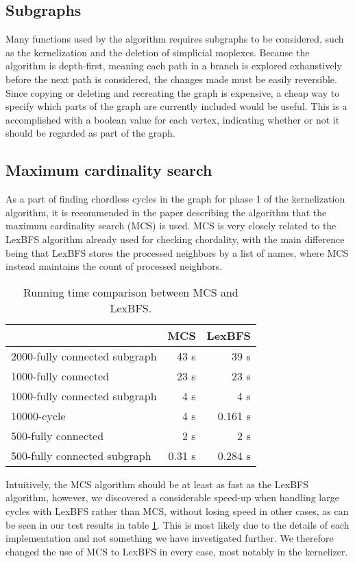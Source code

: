 \documentclass{article}
\begin{document}
		\subsection{Subgraphs}
		Many functions used by the algorithm requires subgraphs to be considered, such as the kernelization and the deletion of simplicial moplexes.
		Because the algorithm is depth-first, meaning each path in a branch is explored exhaustively before the next path is considered, the changes made must be easily reversible.
		Since copying or deleting and recreating the graph is expensive, a cheap way to specify which parts of the graph are currently included would be useful.
		This is a accomplished with a boolean value for each vertex, indicating whether or not it should be regarded as part of the graph.

		\subsection{Maximum cardinality search}
		\label{subsec:maximum-cardinality-search}
		As a part of finding chordless cycles in the graph for phase 1 of the kernelization algorithm, it is recommended in the paper describing the algorithm\cite{kernel} that the maximum cardinality search (MCS) is used.
		MCS is very closely related to the LexBFS algorithm already used for checking chordality, with the main difference being that LexBFS stores the processed neighbors by a list of names, where MCS instead maintains the count of processed neighbors.

		\begin{table}[!ht]
			\centering
			\begin{tabular}{| l | r | r |}
			\hline
											& MCS 		& LexBFS 	\\ \hline
			2000-fully connected subgraph	& 43 s  	& 39 s 		\\ \hline
			1000-fully connected 			& 23 s 		& 23 s 		\\ \hline
			1000-fully connected subgraph	& 4 s   	& 4 s 		\\ \hline
			10000-cycle 					& 4 s   	& 0.161 s 	\\ \hline 
			500-fully connected 			& 2 s   	& 2 s 		\\ \hline 
			500-fully connected subgraph 	& 0.31 s 	& 0.284 s 	\\ \hline 
			\end{tabular}
			\caption{Running time comparison between MCS and LexBFS.}
			\label{table:maximum-cardinality-search}
		\end{table}
		Intuitively, the MCS algorithm should be at least as fast as the LexBFS algorithm, however, we discovered a considerable speed-up when handling large cycles with LexBFS rather than MCS, without losing speed in other cases, as can be seen in our test results in table \ref{table:maximum-cardinality-search}.
		This is most likely due to the details of each implementation and not something we have investigated further.
		We therefore changed the use of MCS to LexBFS in every case, most notably in the kernelizer.
\end{document}
